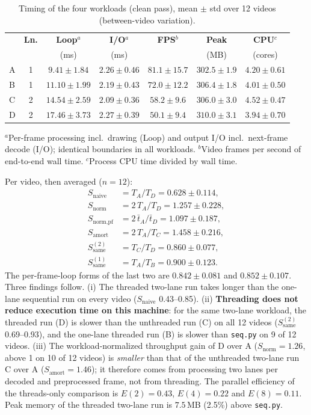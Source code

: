 \documentclass[conference]{IEEEtran}
\newcommand{\code}[1]{\texttt{#1}}
\begin{document}
\begin{table}[t]
\centering
\caption{Timing of the four workloads (clean pass), mean $\pm$ std over
12 videos (between-video variation).}
\label{tab:results-timing}
\scriptsize
\setlength{\tabcolsep}{2.5pt}
\begin{tabular}{lcccccc}
\toprule
 & \textbf{Ln.} & \textbf{Loop$^{a}$} & \textbf{I/O$^{a}$} & \textbf{FPS$^{b}$} & \textbf{Peak} & \textbf{CPU$^{c}$} \\
 & & (ms) & (ms) & & (MB) & (cores) \\
\midrule
A & 1 & $9.41\pm1.84$ & $2.26\pm0.46$ & $81.1\pm15.7$ & $302.5\pm1.9$ & $4.20\pm0.61$ \\
B & 1 & $11.10\pm1.99$ & $2.19\pm0.43$ & $72.0\pm12.2$ & $306.4\pm1.8$ & $4.01\pm0.50$ \\
C & 2 & $14.54\pm2.59$ & $2.09\pm0.36$ & $58.2\pm9.6$ & $306.0\pm3.0$ & $4.52\pm0.47$ \\
D & 2 & $17.46\pm3.73$ & $2.27\pm0.39$ & $50.1\pm9.4$ & $310.0\pm3.1$ & $3.94\pm0.70$ \\
\bottomrule
\end{tabular}

\smallskip
\parbox{\columnwidth}{\scriptsize $^{a}$Per-frame processing incl.\ drawing
(Loop) and output I/O incl.\ next-frame decode (I/O); identical
boundaries in all workloads.
$^{b}$Video frames per second of end-to-end wall time.
$^{c}$Process CPU time divided by wall time.}
\end{table}

Per video, then averaged ($n=12$):
\begin{align}
S_{\text{naive}} &= T_A/T_D = 0.628 \pm 0.114,\\
S_{\text{norm}} &= 2\,T_A/T_D = 1.257 \pm 0.228,
\label{eq:measured-speedup}\\
S_{\text{norm,pf}} &= 2\,\bar t_A/\bar t_D = 1.097 \pm 0.187,\\
S_{\text{amort}} &= 2\,T_A/T_C = 1.458 \pm 0.216,\\
S_{\text{same}}^{(2)} &= T_C/T_D = 0.860 \pm 0.077,\\
S_{\text{same}}^{(1)} &= T_A/T_B = 0.900 \pm 0.123.
\end{align}
The per-frame-loop forms of the last two are $0.842\pm0.081$ and
$0.852\pm0.107$. Three findings follow. (i) The threaded two-lane run
takes longer than the one-lane sequential run on every video
($S_{\text{naive}}$ 0.43--0.85). (ii) \textbf{Threading does not reduce
execution time on this machine}: for the same two-lane workload, the
threaded run (D) is slower than the unthreaded run (C) on all 12 videos
($S_{\text{same}}^{(2)}$ 0.69--0.93), and the one-lane threaded run (B)
is slower than \code{seq.py} on 9 of 12 videos. (iii) The
workload-normalized throughput gain of D over A ($S_{\text{norm}}=1.26$,
above 1 on 10 of 12 videos) is \emph{smaller} than that of the
unthreaded two-lane run C over A ($S_{\text{amort}}=1.46$); it therefore
comes from processing two lanes per decoded and preprocessed frame, not
from threading. The parallel efficiency of the threads-only comparison
is $E(2)=0.43$, $E(4)=0.22$ and $E(8)=0.11$. Peak memory of the threaded
two-lane run is $7.5$\,MB (2.5\%) above \code{seq.py}.
\end{document}
